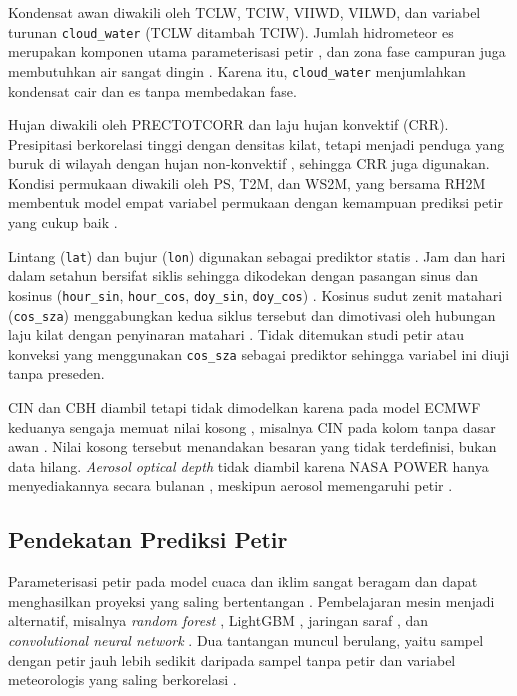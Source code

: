 Kondensat awan diwakili oleh TCLW, TCIW, VIIWD, VILWD, dan variabel turunan \texttt{cloud\_water} (TCLW ditambah TCIW).
Jumlah hidrometeor es merupakan komponen utama parameterisasi petir \cite{cheng2024MLLP}, dan zona fase campuran juga membutuhkan air sangat dingin \cite{shanTBDMLI}.
Karena itu, \texttt{cloud\_water} menjumlahkan kondensat cair dan es tanpa membedakan fase.

Hujan diwakili oleh PRECTOTCORR dan laju hujan konvektif (CRR).
Presipitasi berkorelasi tinggi dengan densitas kilat, tetapi menjadi penduga yang buruk di wilayah dengan hujan non-konvektif \cite{cheng2024MLLP}, sehingga CRR juga digunakan.
Kondisi permukaan diwakili oleh PS, T2M, dan WS2M, yang bersama RH2M membentuk model empat variabel permukaan dengan kemampuan prediksi petir yang cukup baik \cite{shanTBDMLI}.

Lintang (\texttt{lat}) dan bujur (\texttt{lon}) digunakan sebagai prediktor statis \cite{sobash2025MLP}.
Jam dan hari dalam setahun bersifat siklis sehingga dikodekan dengan pasangan sinus dan kosinus (\texttt{hour\_sin}, \texttt{hour\_cos}, \texttt{doy\_sin}, \texttt{doy\_cos}) \cite{sobash2025MLP}.
Kosinus sudut zenit matahari (\texttt{cos\_sza}) menggabungkan kedua siklus tersebut dan dimotivasi oleh hubungan laju kilat dengan penyinaran matahari \cite{peterson2021LISOTD}.
Tidak ditemukan studi petir atau konveksi yang menggunakan \texttt{cos\_sza} sebagai prediktor sehingga variabel ini diuji tanpa preseden.

CIN dan CBH diambil tetapi tidak dimodelkan karena pada model ECMWF keduanya sengaja memuat nilai kosong \cite{ecmwf2015cy41r1}, misalnya CIN pada kolom tanpa dasar awan \cite{ecmwf2026era5doc}.
Nilai kosong tersebut menandakan besaran yang tidak terdefinisi, bukan data hilang.
\textit{Aerosol optical depth} tidak diambil karena NASA POWER hanya menyediakannya secara bulanan \cite{nasapower}, meskipun aerosol memengaruhi petir \cite{song2023LNAI}.

\subsection{Pendekatan Prediksi Petir}
Parameterisasi petir pada model cuaca dan iklim sangat beragam dan dapat menghasilkan proyeksi yang saling bertentangan \cite{kalashnikov2024PCG}.
Pembelajaran mesin menjadi alternatif, misalnya \textit{random forest} \cite{shanTBDMLI}, LightGBM \cite{song2023LNAI}, jaringan saraf \cite{sobash2025MLP}, dan \textit{convolutional neural network} \cite{kalashnikov2024PCG}.
Dua tantangan muncul berulang, yaitu sampel dengan petir jauh lebih sedikit daripada sampel tanpa petir \cite{song2023LNAI} dan variabel meteorologis yang saling berkorelasi \cite{cheng2024MLLP}.


